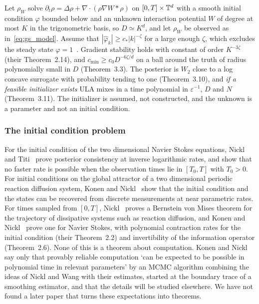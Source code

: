 \begin{remark}\label{rem:gs_cn}
Let $\rho_W$ solve $\partial_t\rho=\Delta\rho+\nabla\cdot(\rho\nabla W*\rho)$ on $[0,T]\times\mathbb{T}^d$ with a smooth initial condition $\varphi$ bounded below and an unknown interaction potential $W$ of degree at most $K$ in the trigonometric basis, so $D\simeq K^d$, and let $\rho_W$ be observed as in~\eqref{eq:gs_model}. Assume that $|\hat\varphi_k|\ge c_*|k|^{-\zeta}$ for a large enough $\zeta$, which excludes the steady state $\varphi=1$~\cite{nickl2025}. Gradient stability holds with constant of order $K^{-3\zeta}$ (their Theorem~2.14), and $c_{\min}\ge c_0D^{-6\zeta/d}$ on a ball around the truth of radius polynomially small in $D$ (Theorem~3.3). The posterior is $W_2$ close to a log concave surrogate with probability tending to one (Theorem~3.10), and \emph{if a feasible initializer exists} ULA mixes in a time polynomial in $\varepsilon^{-1}$, $D$ and $N$ (Theorem~3.11). The initializer is assumed, not constructed, and the unknown is a parameter and not an initial condition.
\end{remark}

\subsubsection{The initial condition problem} For the initial condition of the two dimensional Navier Stokes equations, Nickl and Titi~\cite{nickltiti2024} prove posterior consistency at inverse logarithmic rates, and show that no faster rate is possible when the observation times lie in $[T_0,T]$ with $T_0>0$. For initial conditions on the global attractor of a two dimensional periodic reaction diffusion system, Konen and Nickl~\cite{konennickl2026attractor} show that the initial condition and the states can be recovered from discrete measurements at near parametric rates. For times sampled from $[0,T]$, Nickl~\cite{nicklbvm2024} proves a Bernstein von Mises theorem for the trajectory of dissipative systems such as reaction diffusion, and Konen and Nickl~\cite{konennickl2026} prove one for Navier Stokes, with polynomial contraction rates for the initial condition (their Theorem~2.2) and invertibility of the information operator (Theorem~2.6). None of this is a theorem about computation. Konen and Nickl say only that provably reliable computation `can be expected to be possible in polynomial time in relevant parameters' by an MCMC algorithm combining the ideas of Nickl and Wang with their estimates, started at the boundary trace of a smoothing estimator, and that the details will be studied elsewhere. We have not found a later paper that turns these expectations into theorems.

